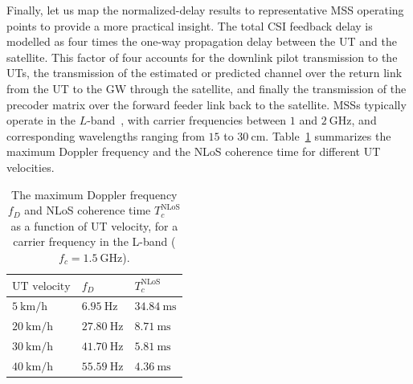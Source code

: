 Finally, let us map the normalized-delay results to representative \ac{MSS} operating points to provide a more practical insight.
The total \ac{CSI} feedback delay is modelled as four times the one-way propagation delay between the \ac{UT} and the satellite. This factor of four accounts for the downlink pilot transmission to the \acp{UT}, the transmission of the estimated or predicted channel over the return link from the \ac{UT} to the \ac{GW} through the satellite, and finally the transmission of the precoder matrix over the forward feeder link back to the satellite.
\acp{MSS} typically operate in the $L$-band~\cite{1_signal_processing_for_satellites}, with carrier frequencies between $1$ and $2~\mathrm{GHz}$, and corresponding wavelengths ranging from $15$ to $30~\mathrm{cm}$.
Table~\ref{tab:coherence_times} summarizes the maximum Doppler frequency and the \ac{NLoS} coherence time for different \ac{UT} velocities.
\begin{table}[!htb]
    \centering
    \renewcommand{\arraystretch}{1.25}
    \setlength{\tabcolsep}{10pt}

    \begin{tabular}{>{\centering\arraybackslash}m{3.2cm}|>{\centering\arraybackslash}m{2.8cm}>{\centering\arraybackslash}m{2.8cm}}
        \hline
        $\text{UT velocity}$ & $f_D$ & $T_c^{\mathrm{NLoS}}$ \\
        \hline
        $5~\mathrm{km/h}$  & $6.95~\mathrm{Hz}$  & $34.84~\mathrm{ms}$ \\
        $20~\mathrm{km/h}$ & $27.80~\mathrm{Hz}$ & $8.71~\mathrm{ms}$  \\
        $30~\mathrm{km/h}$ & $41.70~\mathrm{Hz}$ & $5.81~\mathrm{ms}$  \\
        $40~\mathrm{km/h}$ & $55.59~\mathrm{Hz}$ & $4.36~\mathrm{ms}$  \\
        \hline
    \end{tabular}

    \caption[\acs{NLoS} coherence time at $f_c = 1.5~\mathrm{GHz}$ (L-band) for various \ac{UT} velocities]{
        The maximum Doppler frequency $f_D$ and \ac{NLoS} coherence time $T_c^{\mathrm{NLoS}}$ as a function of \ac{UT} velocity, for a carrier frequency in the L-band ($f_c = 1.5~\mathrm{GHz}$).
    }
    \label{tab:coherence_times}
\end{table}

